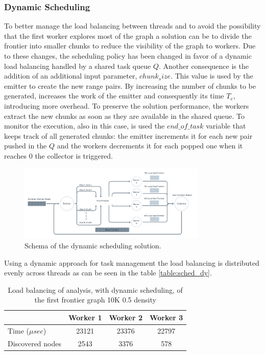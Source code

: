 \subsubsection{Dynamic Scheduling}
To better manage the load balancing between threads and to avoid the possibility that the first worker explores most of the graph a solution can be to divide the frontier into smaller chunks to reduce the visibility of the graph to workers. Due to these changes, the scheduling policy has been changed in favor of a dynamic load balancing handled by a shared task queue $Q$. Another consequence is the addition of an additional input parameter, $chunk_size$. This value is used by the emitter to create the new range pairs. By increasing the number of chunks to be generated, increases the work of the emitter and consequently its time $T_e$, introducing more overhead. To preserve the solution performance, the workers extract the new chunks as soon as they are available in the shared queue.
To monitor the execution, also in this case, is used the $end\_of\_task$ variable that keeps track of all generated chunks: the emitter increments it for each new pair pushed in the $Q$ and the workers decrements it for each popped one when it reaches $0$ the collector is triggered.


\begin{figure}[htb!]
    \centering
    \includegraphics[width=0.8\textwidth]{Figures/par_dy.png}
    \caption{Schema of the dynamic scheduling solution.}
    \label{fig:bfs_par_2_schema}
\end{figure}
\FloatBarrier

Using a dynamic approach for task management the load balancing is distributed evenly across threads as can be seen in the table \ref{table:sched_dy}.
\label{table:sched_dy}
\begin{table}[htb!]
\centering
\begin{tabular}{l|c|c|c|}
\cline{2-4}
\multicolumn{1}{c|}{}                  & Worker 1 & Worker 2 & Worker 3 \\ \hline
\multicolumn{1}{|l|}{Time ($\mu sec$)}             & 23121    & 23376    & 22797    \\ \hline
\multicolumn{1}{|l|}{Discovered nodes} & 2543     & 3376     & 578      \\ \hline
\end{tabular}
\caption{Load balancing of analysis, with dynamic scheduling, of the first frontier graph 10K 0.5 density}
\end{table}

